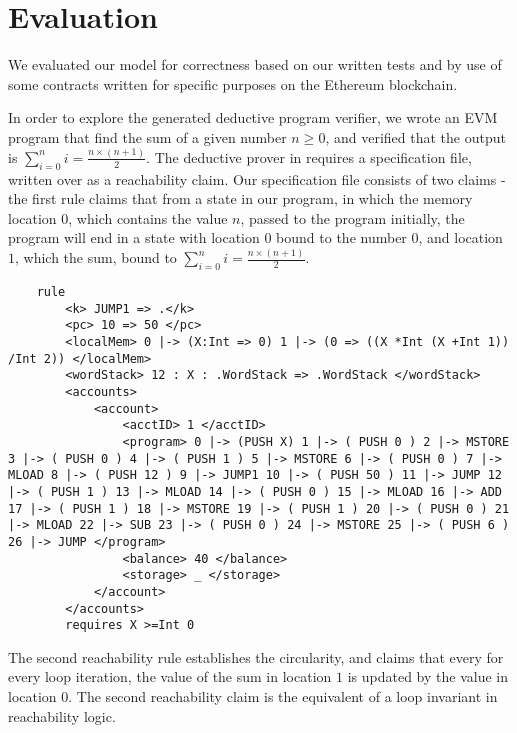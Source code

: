 \section{Evaluation}
We evaluated our model for correctness based on our written tests and by use of
some contracts written for specific purposes on the Ethereum blockchain.


In order to explore the generated deductive program verifier, we wrote an EVM program that find the sum of a given number $n \geq 0 $, and verified that the output is $ \sum_{i = 0}^{n} i =  \frac{n \times  (n + 1 )}{2}$. The deductive prover in \K{} requires a specification file, written over as a reachability claim. Our specification file consists of two claims - the first rule claims that from a state in our program, in which the memory location $0$, which contains the value $n$, passed to the program initially, the program will end in a state with location $0$ bound to the number $0$, and location $1$, which the sum, bound to $ \sum_{i = 0}^{n} i =  \frac{n \times  (n + 1 )}{2} $. 

\begin{verbatim}
    rule
        <k> JUMP1 => .</k>
        <pc> 10 => 50 </pc>
        <localMem> 0 |-> (X:Int => 0) 1 |-> (0 => ((X *Int (X +Int 1)) /Int 2)) </localMem>
        <wordStack> 12 : X : .WordStack => .WordStack </wordStack> 
        <accounts> 
            <account> 
	            <acctID> 1 </acctID> 
	            <program> 0 |-> (PUSH X) 1 |-> ( PUSH 0 ) 2 |-> MSTORE 3 |-> ( PUSH 0 ) 4 |-> ( PUSH 1 ) 5 |-> MSTORE 6 |-> ( PUSH 0 ) 7 |-> MLOAD 8 |-> ( PUSH 12 ) 9 |-> JUMP1 10 |-> ( PUSH 50 ) 11 |-> JUMP 12 |-> ( PUSH 1 ) 13 |-> MLOAD 14 |-> ( PUSH 0 ) 15 |-> MLOAD 16 |-> ADD 17 |-> ( PUSH 1 ) 18 |-> MSTORE 19 |-> ( PUSH 1 ) 20 |-> ( PUSH 0 ) 21 |-> MLOAD 22 |-> SUB 23 |-> ( PUSH 0 ) 24 |-> MSTORE 25 |-> ( PUSH 6 ) 26 |-> JUMP </program> 
	            <balance> 40 </balance>
	            <storage> _ </storage>
            </account> 
        </accounts>
        requires X >=Int 0 
\end{verbatim}        



The second reachability rule establishes the circularity, and claims that every for every loop iteration, the value of the sum in location $1$ is updated by the value in location $0$. The second reachability claim is the equivalent of a loop invariant in reachability logic.

